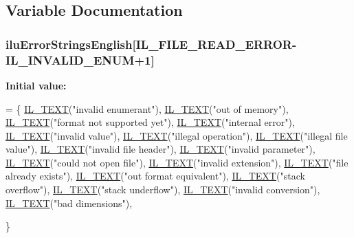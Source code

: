 \subsection{Variable Documentation}
\hypertarget{ilu__err-english_8h_a74847ade99ac934be5a54b15fb8ab45e}{
\subsubsection[{ilu\-Error\-Strings\-English}]{ ilu\-Error\-Strings\-English\mbox{[}{\bf I\-L\-\_\-\-F\-I\-L\-E\-\_\-\-R\-E\-A\-D\-\_\-\-E\-R\-R\-O\-R}-\/{\bf I\-L\-\_\-\-I\-N\-V\-A\-L\-I\-D\-\_\-\-E\-N\-U\-M}+1\mbox{]}}}\label{ilu__err-english_8h_a74847ade99ac934be5a54b15fb8ab45e}
{\bfseries Initial value\-:}
\begin{DoxyCode}
= \{
    \hyperlink{il_8h_a2907c2129d2ba2ebbae6aa6a69b7f685}{IL\_TEXT}(\textcolor{stringliteral}{"invalid enumerant"}),
    \hyperlink{il_8h_a2907c2129d2ba2ebbae6aa6a69b7f685}{IL\_TEXT}(\textcolor{stringliteral}{"out of memory"}),
    \hyperlink{il_8h_a2907c2129d2ba2ebbae6aa6a69b7f685}{IL\_TEXT}(\textcolor{stringliteral}{"format not supported yet"}),
    \hyperlink{il_8h_a2907c2129d2ba2ebbae6aa6a69b7f685}{IL\_TEXT}(\textcolor{stringliteral}{"internal error"}),
    \hyperlink{il_8h_a2907c2129d2ba2ebbae6aa6a69b7f685}{IL\_TEXT}(\textcolor{stringliteral}{"invalid value"}),
    \hyperlink{il_8h_a2907c2129d2ba2ebbae6aa6a69b7f685}{IL\_TEXT}(\textcolor{stringliteral}{"illegal operation"}),
    \hyperlink{il_8h_a2907c2129d2ba2ebbae6aa6a69b7f685}{IL\_TEXT}(\textcolor{stringliteral}{"illegal file value"}),
    \hyperlink{il_8h_a2907c2129d2ba2ebbae6aa6a69b7f685}{IL\_TEXT}(\textcolor{stringliteral}{"invalid file header"}),
    \hyperlink{il_8h_a2907c2129d2ba2ebbae6aa6a69b7f685}{IL\_TEXT}(\textcolor{stringliteral}{"invalid parameter"}),
    \hyperlink{il_8h_a2907c2129d2ba2ebbae6aa6a69b7f685}{IL\_TEXT}(\textcolor{stringliteral}{"could not open file"}),
    \hyperlink{il_8h_a2907c2129d2ba2ebbae6aa6a69b7f685}{IL\_TEXT}(\textcolor{stringliteral}{"invalid extension"}),
    \hyperlink{il_8h_a2907c2129d2ba2ebbae6aa6a69b7f685}{IL\_TEXT}(\textcolor{stringliteral}{"file already exists"}),
    \hyperlink{il_8h_a2907c2129d2ba2ebbae6aa6a69b7f685}{IL\_TEXT}(\textcolor{stringliteral}{"out format equivalent"}),
    \hyperlink{il_8h_a2907c2129d2ba2ebbae6aa6a69b7f685}{IL\_TEXT}(\textcolor{stringliteral}{"stack overflow"}),
    \hyperlink{il_8h_a2907c2129d2ba2ebbae6aa6a69b7f685}{IL\_TEXT}(\textcolor{stringliteral}{"stack underflow"}),
    \hyperlink{il_8h_a2907c2129d2ba2ebbae6aa6a69b7f685}{IL\_TEXT}(\textcolor{stringliteral}{"invalid conversion"}),
    \hyperlink{il_8h_a2907c2129d2ba2ebbae6aa6a69b7f685}{IL\_TEXT}(\textcolor{stringliteral}{"bad dimensions"}),

\}
\end{DoxyCode}
